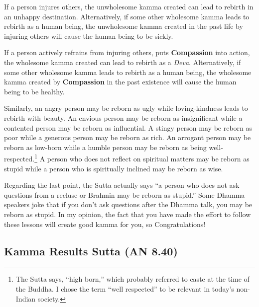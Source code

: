 If a person injures others, the unwholesome kamma created can lead to rebirth in an unhappy destination. Alternatively, if some other wholesome kamma leads to rebirth as a human being, the unwholesome kamma created in the past life by injuring others will cause the human being to be sickly. 

If a person actively refrains from injuring others, puts \textbf{Compassion} into action, the wholesome kamma created can lead to rebirth as a \textit{Deva}. Alternatively, if some other wholesome kamma leads to rebirth as a human being, the wholesome kamma created by \textbf{Compassion} in the past existence will cause the human being to be healthy.

Similarly, an angry person may be reborn as ugly while loving-kindness leads to rebirth with beauty. An envious person may be reborn as insignificant while a contented person may be reborn as influential. A stingy person may be reborn as poor while a generous person may be reborn as rich. An arrogant person may be reborn as low-born while a humble person may be reborn as being well-respected.\footnote{The Sutta says, “high born,” which probably referred to caste at the time of the Buddha. I chose the term “well respected” to be relevant in today’s non-Indian society.} A person who does not reflect on spiritual matters may be reborn as stupid while a person who is spiritually inclined may be reborn as wise.

Regarding the last point, the Sutta actually says “a person who does not ask questions from a recluse or Brahmin may be reborn as stupid.” Some Dhamma speakers joke that if you don’t ask questions after the Dhamma talk, you may be reborn as stupid. In my opinion, the fact that you have made the effort to follow these lessons will create good kamma for you, so Congratulations! \smiley 

\pagebreak

\subsection*{Kamma Results Sutta (AN 8.40)}

